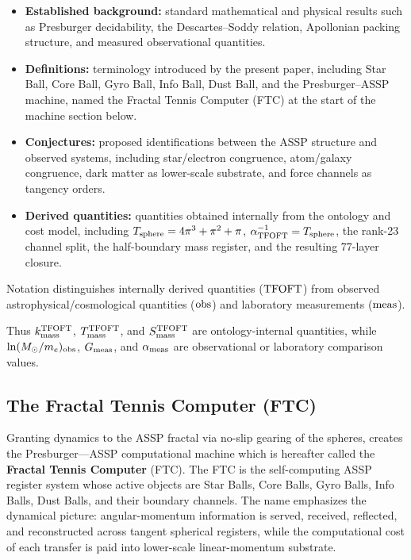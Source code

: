 \documentclass[11pt,a4paper]{article}
\begin{document}
\begin{itemize}
  \item \textbf{Established background:} standard mathematical and physical
  results such as Presburger decidability, the Descartes--Soddy relation,
  Apollonian packing structure, and measured observational quantities.

  \item \textbf{Definitions:} terminology introduced by the present paper,
  including Star Ball, Core Ball, Gyro Ball, Info Ball, Dust Ball, and the
  Presburger--ASSP machine, named the Fractal Tennis Computer (FTC) at the
  start of the machine section below.

  \item \textbf{Conjectures:} proposed identifications between the ASSP
  structure and observed systems, including star/electron congruence,
  atom/galaxy congruence, dark matter as lower-scale substrate, and force
  channels as tangency orders.

  \item \textbf{Derived quantities:} quantities obtained internally from the
  ontology and cost model, including
  \(T_{\rm sphere}=4\pi^3+\pi^2+\pi\),
  \(\alpha^{-1}_{\rm TFOFT}=T_{\rm sphere}\),
  the rank-23 channel split,
  the half-boundary mass register,
  and the resulting 77-layer closure.
\end{itemize}

Notation distinguishes internally derived quantities
(\({\rm TFOFT}\)) from observed astrophysical/cosmological quantities
(\({\rm obs}\)) and laboratory measurements (\({\rm meas}\)).

Thus \(k_{\rm mass}^{\rm TFOFT}\),
\(T_{\rm mass}^{\rm TFOFT}\), and
\(S_{\rm mass}^{\rm TFOFT}\) are ontology-internal quantities, while
\(\ln(M_\odot/m_e)_{\rm obs}\),
\(G_{\rm meas}\), and
\(\alpha_{\rm meas}\) are observational or laboratory comparison values.


\subsection{The Fractal Tennis Computer (FTC)}

Granting dynamics to the ASSP fractal via no-slip gearing of the spheres, creates the Presburger---ASSP computational machine which is hereafter called the \textbf{Fractal Tennis Computer} (FTC). The FTC is the self-computing ASSP register system whose active objects are Star Balls, Core Balls, Gyro Balls, Info Balls, Dust Balls, and their boundary channels. The name emphasizes the dynamical picture: angular-momentum information is served, received, reflected, and reconstructed across tangent spherical registers, while the computational cost of each transfer is paid into lower-scale linear-momentum substrate.
\end{document}
